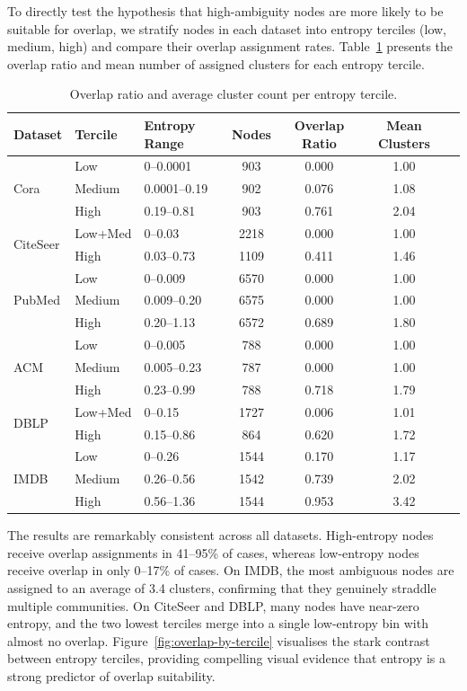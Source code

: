 \documentclass[pdflatex,sn-mathphys-num]{sn-jnl}%
\theoremstyle{thmstyleone}%
\theoremstyle{thmstyletwo}%
\theoremstyle{thmstylethree}%
\begin{document}
To directly test the hypothesis that high-ambiguity nodes are more likely to be suitable for overlap, we stratify nodes in each dataset into entropy terciles (low, medium, high) and compare their overlap assignment rates.
Table~\ref{tab:stratified} presents the overlap ratio and mean number of assigned clusters for each entropy tercile.

\begin{table}[ht]
\centering
\caption{Overlap ratio and average cluster count per entropy tercile.}
\label{tab:stratified}
\begin{tabular}{lllcccc}
\toprule
\textbf{Dataset} & \textbf{Tercile} & \textbf{Entropy Range} & \textbf{Nodes} & \textbf{Overlap Ratio} & \textbf{Mean Clusters} \\
\midrule
\multirow{3}{*}{Cora}
  & Low    & 0--0.0001    & 903  & 0.000 & 1.00 \\
  & Medium & 0.0001--0.19 & 902  & 0.076 & 1.08 \\
  & High   & 0.19--0.81   & 903  & 0.761 & 2.04 \\
\midrule
\multirow{2}{*}{CiteSeer}
  & Low+Med & 0--0.03     & 2218 & 0.000 & 1.00 \\
  & High    & 0.03--0.73  & 1109 & 0.411 & 1.46 \\
\midrule
\multirow{3}{*}{PubMed}
  & Low    & 0--0.009     & 6570 & 0.000 & 1.00 \\
  & Medium & 0.009--0.20  & 6575 & 0.000 & 1.00 \\
  & High   & 0.20--1.13   & 6572 & 0.689 & 1.80 \\
\midrule
\multirow{3}{*}{ACM}
  & Low    & 0--0.005     & 788  & 0.000 & 1.00 \\
  & Medium & 0.005--0.23  & 787  & 0.000 & 1.00 \\
  & High   & 0.23--0.99   & 788  & 0.718 & 1.79 \\
\midrule
\multirow{2}{*}{DBLP}
  & Low+Med & 0--0.15     & 1727 & 0.006 & 1.01 \\
  & High    & 0.15--0.86  & 864  & 0.620 & 1.72 \\
\midrule
\multirow{3}{*}{IMDB}
  & Low    & 0--0.26      & 1544 & 0.170 & 1.17 \\
  & Medium & 0.26--0.56   & 1542 & 0.739 & 2.02 \\
  & High   & 0.56--1.36   & 1544 & 0.953 & 3.42 \\
\bottomrule
\end{tabular}
\end{table}

The results are remarkably consistent across all datasets. 
High-entropy nodes receive overlap assignments in 41--95\% of cases, whereas low-entropy nodes receive overlap in only 0--17\% of cases. 
On IMDB, the most ambiguous nodes are assigned to an average of 3.4 clusters, confirming that they genuinely straddle multiple communities. 
On CiteSeer and DBLP, many nodes have near-zero entropy, and the two lowest terciles merge into a single low-entropy bin with almost no overlap. 
Figure~\ref{fig:overlap-by-tercile} visualises the stark contrast between entropy terciles, providing compelling visual evidence that entropy is a strong predictor of overlap suitability.
\end{document}
